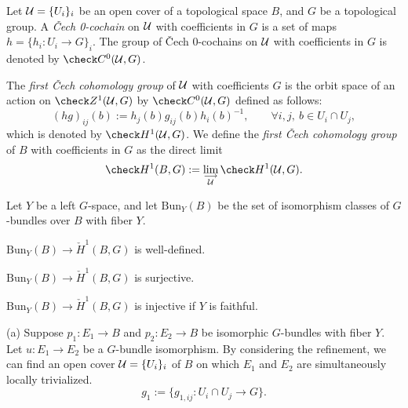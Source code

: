 \documentclass{../../large}
\begin{document}
\begin{prb}
Let $\mathcal{U}=\{U_i\}_i$ be an open cover of a topological space $B$, and $G$ be a topological group. 
A \emph{\v Cech 0-cochain} on $\mathcal{U}$ with coefficients in $G$ is a set of maps $h=\{h_i:U_i\to G\}_i$.
The group of \v Cech 0-cochains on $\mathcal{U}$ with coefficients in $G$ is denoted by $\check C^0(\cU,G)$.

The \emph{first \v Cech cohomology group} of $\mathcal{U}$ with coefficients $G$ is the orbit space of an action on $\check Z^1(\cU,G)$ by $\check C^0(\cU,G)$ defined as follows:
\[(hg)_{ij}(b):=h_j(b)g_{ij}(b)h_i(b)^{-1},
\qquad\forall i,j,\ b\in U_i\cap U_j,\]
which is denoted by $\check H^1(\cU,G)$.
We define the \emph{first \v Cech cohomology group} of $B$ with coefficients in $G$ as the direct limit
\[\check H^1(B,G):=\lim_{\substack{\longrightarrow\\\cU}}\check H^1(\cU,G).\]

Let $Y$ be a left $G$-space, and let $\mathrm{Bun}_Y(B)$ be the set of isomorphism classes of $G$-bundles over $B$ with fiber $Y$.
\begin{parts}
\item $\mathrm{Bun}_Y(B)\to\check H^1(B,G)$ is well-defined.
\item $\mathrm{Bun}_Y(B)\to\check H^1(B,G)$ is surjective.
\item $\mathrm{Bun}_Y(B)\to\check H^1(B,G)$ is injective if $Y$ is faithful.
\end{parts}
\end{prb}
\begin{pf}
(a)
Suppose $p_1:E_1\to B$ and $p_2:E_2\to B$ be isomorphic $G$-bundles with fiber $Y$.
Let $u:E_1\to E_2$ be a $G$-bundle isomorphism.
By considering the refinement, we can find an open cover $\mathcal{U}=\{U_i\}_i$ of $B$ on which $E_1$ and $E_2$ are simultaneously locally trivialized.
\[g_1:=\{g_{1,ij}:U_i\cap U_j\to G\}.\]

\end{pf}
\end{document}
